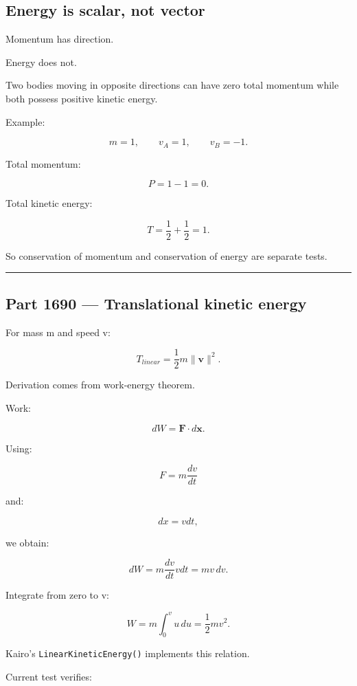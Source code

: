 \subsection{Energy is scalar, not vector}\label{06-engine-ii-ch039-energy-is-scalar-not-vector}

Momentum has direction.

Energy does not.

Two bodies moving in opposite directions can have zero total momentum while both possess positive kinetic energy.

Example:

\[
m=1,
\qquad
v_A=1,
\qquad
v_B=-1.
\]

Total momentum:

\[
P=1-1=0.
\]

Total kinetic energy:

\[
T=
\frac12+
\frac12
=
1.
\]

So conservation of momentum and conservation of energy are separate tests.

\begin{center}\rule{0.5\linewidth}{0.5pt}\end{center}

\subsection{Part 1690 --- Translational kinetic energy}\label{06-engine-ii-ch039-part-1690-translational-kinetic-energy}

For mass m and speed v:

\[
\boxed{
T_{linear}
=
\frac12m\|\mathbf v\|^2.
}
\]

Derivation comes from work-energy theorem.

Work:

\[
dW
=
\mathbf F\cdot d\mathbf x.
\]

Using:

\[
F=m\frac{dv}{dt}
\]

and:

\[
dx=vdt,
\]

we obtain:

\[
dW
=
m\frac{dv}{dt}vdt
=
mv\,dv.
\]

Integrate from zero to v:

\[
W
=
m\int_0^v u\,du
=
\frac12mv^2.
\]

Kairo's \texttt{LinearKineticEnergy()} implements this relation.

Current test verifies:

